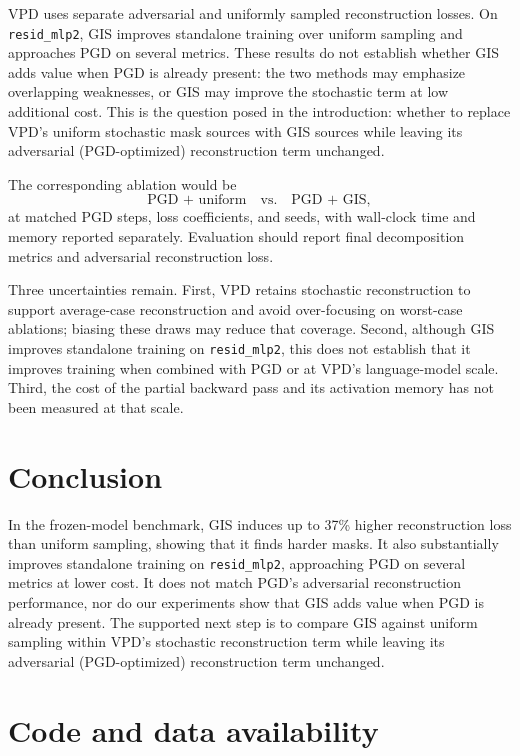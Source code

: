 \documentclass[11pt]{article}
\begin{document}
VPD uses separate adversarial and uniformly sampled reconstruction losses. On
\texttt{resid\_mlp2}, GIS improves standalone training over uniform sampling and
approaches PGD on several metrics. These results do not establish whether GIS adds value
when PGD is already present: the two methods may emphasize overlapping weaknesses, or
GIS may improve the stochastic term at low additional cost. This is the question posed
in the introduction: whether to replace VPD's uniform stochastic mask sources with GIS
sources while leaving its adversarial (PGD-optimized) reconstruction term unchanged.

The corresponding ablation would be
\begin{equation*}
 \text{PGD + uniform} \quad\text{vs.}\quad \text{PGD + GIS},
\end{equation*}
at matched PGD steps, loss coefficients, and seeds, with wall-clock time and memory
reported separately. Evaluation should report final decomposition metrics and
adversarial reconstruction loss.

Three uncertainties remain. First, VPD retains stochastic reconstruction to support
average-case reconstruction and avoid over-focusing on worst-case ablations; biasing
these draws may reduce that coverage. Second, although GIS improves standalone training
on \texttt{resid\_mlp2}, this does not establish that it improves training when combined
with PGD or at VPD's language-model scale. Third, the cost of the partial backward pass
and its activation memory has not been measured at that scale.

\section{Conclusion}

In the frozen-model benchmark, GIS induces up to 37\% higher reconstruction loss than
uniform sampling, showing that it finds harder masks. It also substantially improves
standalone training on \texttt{resid\_mlp2}, approaching PGD on several metrics at lower
cost. It does not match PGD's adversarial reconstruction performance, nor do our
experiments show that GIS adds value when PGD is already present. The supported next
step is to compare GIS against uniform sampling within VPD's stochastic reconstruction
term while leaving its adversarial (PGD-optimized) reconstruction term unchanged.

\section*{Code and data availability}
\end{document}
